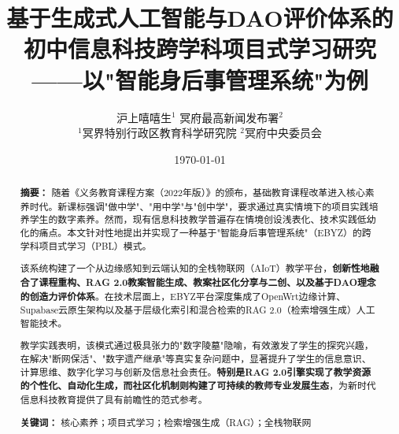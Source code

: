 \documentclass[12pt,a4paper,fontset=fandol]{ctexart}
\title{\heiti\zihao{2}\bfseries 基于生成式人工智能与DAO评价体系的初中信息科技跨学科项目式学习研究\\[0.5em] \large ——以"智能身后事管理系统"为例}
\author{\fangsong 沪上嘻嘻生$^{1}$ \quad 冥府最高新闻发布署$^{2}$ \\[0.3em] \small $^{1}$冥界特别行政区教育科学研究院 \quad $^{2}$冥府中央委员会}
\date{\today}
\begin{document}
\maketitle

\begin{abstract}
\kaishu
\noindent \textbf{摘要：} 随着《义务教育课程方案（2022年版）》的颁布，基础教育课程改革进入核心素养时代。新课标强调"做中学"、"用中学"与"创中学"，要求通过真实情境下的项目实践培养学生的数字素养。然而，现有信息科技教学普遍存在情境创设浅表化、技术实践低幼化的痛点。本文针对性地提出并实现了一种基于"智能身后事管理系统"（EBYZ）的跨学科项目式学习（PBL）模式。

该系统构建了一个从边缘感知到云端认知的全栈物联网（AIoT）教学平台，\textbf{创新性地融合了课程重构、RAG 2.0教案智能生成、教案社区化分享与二创、以及基于DAO理念的创造力评价体系}。在技术层面上，EBYZ平台深度集成了OpenWrt边缘计算、Supabase云原生架构以及基于层级化索引和混合检索的RAG 2.0（检索增强生成）人工智能技术。

教学实践表明，该模式通过极具张力的"数字陵墓"隐喻，有效激发了学生的探究兴趣，在解决"断网保活"、"数字遗产继承"等真实复杂问题中，显著提升了学生的信息意识、计算思维、数字化学习与创新及信息社会责任。\textbf{特别是RAG 2.0引擎实现了教学资源的个性化、自动化生成，而社区化机制则构建了可持续的教师专业发展生态}，为新时代信息科技教育提供了具有前瞻性的范式参考。

\vspace{0.5em}
\noindent \textbf{关键词：} 核心素养；项目式学习；检索增强生成（RAG）；全栈物联网
\end{abstract}

\newpage
\end{document}
